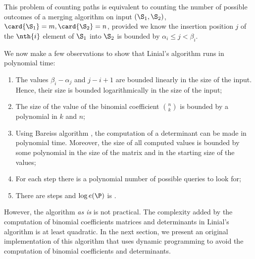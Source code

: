 This problem of counting paths is equivalent to counting the number of possible
outcomes of a merging algorithm on input \((\S_1,\S_2)\), \(\card{\S_1} = m,
\card{\S_2} = n\), provided we know the insertion position \(j\) of the
\(\nth{i}\) element of \(\S_1\) into \(\S_2\) is bounded by \(\alpha_i \le j <
\beta_i\).

We now make a few observations to show that Linial's algorithm runs in
polynomial time:

\begin{enumerate}
\item The values \(\beta_i - \alpha_j\) and \(j - i + 1\) are bounded
linearly in the size of the input. Hence, their size is bounded
logarithmically in the size of the input;
\item The size of the value of the binomial coefficient \(\binom{n}{k}\) is
bounded by a polynomial in \(k\) and \(n\);
\item Using Bareiss algorithm \cite{bareiss:1968}, the computation of a
determinant can be made in polynomial time. Moreover, the size of all computed
values is bounded by some polynomial in the size of the matrix and in the starting
size of the values;
\item For each step there is a polynomial number of possible queries to look for;
\item There are  steps and \(\log e(\P)\) is .
\end{enumerate}

However, the algorithm \emph{as is} is not practical. The complexity added
by the computation of binomial coefficients matrices and determinants in
Linial's algorithm is at least quadratic. In the next section, we present an
original implementation of this algorithm that uses dynamic programming to
avoid the computation of binomial coefficients and determinants.
